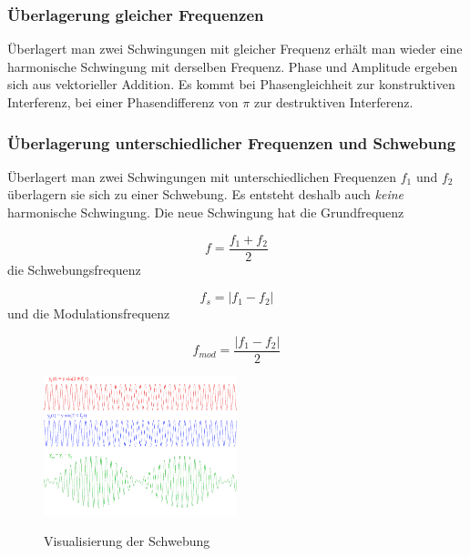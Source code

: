 \documentclass[a4paper]{article}
\begin{document}
			\subsubsection{Überlagerung gleicher Frequenzen}
			
				Überlagert man zwei Schwingungen mit gleicher Frequenz erhält man wieder eine harmonische Schwingung mit derselben Frequenz. Phase und Amplitude ergeben sich aus vektorieller Addition. Es kommt bei Phasengleichheit zur konstruktiven Interferenz, bei einer Phasendifferenz von $\pi$ zur destruktiven Interferenz.
			
			\subsubsection{Überlagerung unterschiedlicher Frequenzen und Schwebung}
			
				Überlagert man zwei Schwingungen mit unterschiedlichen Frequenzen $f_1$ und $f_2$ überlagern sie sich zu einer Schwebung. Es entsteht deshalb auch \textit{keine} harmonische Schwingung. Die neue Schwingung hat die Grundfrequenz
				
				\begin{equation}
					f=\frac{f_1+f_2}{2}
				\end{equation}
				die Schwebungsfrequenz
				
				\begin{equation}
					f_s=|f_1-f_2|
				\end{equation}
				und die Modulationsfrequenz
				
				\begin{equation}
				f_{mod}=\frac{|f_1-f_2|}{2}
				\end{equation}
				
				\begin{figure}[H]
					\centering
					\includegraphics[width=0.5\textwidth]{img/schwebung_k_akustwellen_gru.png}
					\label{img:schwebung_k_akustwellen_gru}
					\caption{Visualisierung der Schwebung}
				\end{figure}
			
\end{document}
